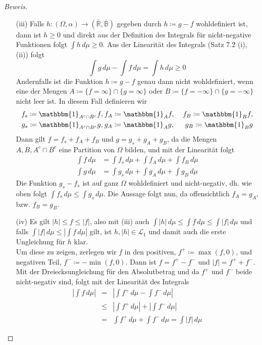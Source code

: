 \documentclass[10pt]{article}
\begin{document}
\begin{proof}[Beweis]
\begin{itemize}
\item[(iii)] 
Falls $h: (\Omega,\alpha) \rightarrow (\bar{\mathbb{R}}, \bar{\mathbb{B}})$ gegeben durch $h \coloneqq g-f$ wohldefiniert ist, dann ist $h \geq 0$ und direkt aus der Definition des Integrals für nicht-negative Funktionen folgt $\int h \, d\mu \geq 0$. 
Aus der Linearität des Integrals (Satz 7.2 (i),(ii)) folgt
$$
\int g \, d\mu - \int f \, d\mu = \int h \, d\mu \geq 0
$$
Andernfalls ist die Funktion $h \coloneqq g-f$ genau dann nicht wohldefiniert, wenn eine der Mengen ${A \coloneqq \{ f = \infty \} \cap \{ g = \infty \} }$ oder  ${B \coloneqq  \{ f = -\infty \} \cap \{ g = -\infty  \}}$ nicht leer ist.
In diesem Fall definieren wir
\begin{eqnarray*}
f_s \coloneqq \mathbbm{1}_{A^c \cap B^c} f, &\: f_A\coloneqq \mathbbm{1}_A f, &\; f_B\coloneqq \mathbbm{1}_B f, \\
g_s \coloneqq \mathbbm{1}_{A^c \cap B^c} g, &\: g_A\coloneqq \mathbbm{1}_A g, &\; g_B \coloneqq \mathbbm{1}_B g
\end{eqnarray*}
Dann gilt  $f = f_s + f_A + f_B$  und $g = g_s + g_A + g_B$, da die Mengen $A,B, A^c \cap B^c$ eine Partition von $\Omega$ bilden, und mit der Linearität folgt
\begin{eqnarray*}
\int f \, d\mu &= \int f _s\, d\mu + \int f_A \, d\mu + \int f_B \, d\mu \\
\int g \, d\mu &= \int g_s \, d\mu + \int g_A \, d\mu + \int  g_B \, d\mu
\end{eqnarray*}
Die Funktion $g_s - f_s$ ist auf ganz $\Omega$ wohldefiniert und nicht-negativ, dh. wie oben folgt ${\int f_s \, d\mu \leq \int g_s \, d\mu}$. Die Aussage folgt nun, da offensichtlich $f_A = g_A$, bzw. $f_B = g_B$.

\item[(iv)] Es gilt $|h| \leq f \leq |f|$, also mit (iii) auch $\int |h| \, d\mu \leq \int f \, d\mu \leq \int |f| \, d\mu$ und falls $\int |f| \, d\mu \leq \left| \int f \, d\mu  \right|$ gilt, ist $h, |h| \in \mathcal{L}_1$ und damit auch die erste Ungleichung für $h$ klar.  \\
Um diese zu zeigen, zerlegen wir $f$ in den positiven, ${f^+ \coloneqq \max(f, 0)}$, und negativen Teil, ${f^- \coloneqq  - \min(f,0)}$. Dann ist $f = f^+ - f^-$ und $|f| = f^+ + f^-$. Mit der Dreiecksungleichung für den Absolutbetrag und da $f^+$ und $f^-$ beide nicht-negativ sind, folgt mit der Linearität des Integrals
\begin{eqnarray*}
\left| \int f \, d\mu \right| &=& \left| \int f^+ \, d\mu  -  \int f^- \, d\mu \right| \\
				     &\leq&  \left| \int f^+ \, d\mu \right| +  \left|  \int f^- \, d\mu \right| \\
				     &=& \int f^+ \, d\mu + \int f^- \, d\mu = \int |f| \, d\mu
\end{eqnarray*}

\end{itemize}
\end{proof}
\end{document}
